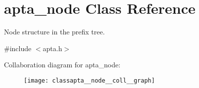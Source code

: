 \hypertarget{classapta__node}{}\section{apta\+\_\+node Class Reference}
\label{classapta__node}


Node structure in the prefix tree.  




{\ttfamily \#include $<$apta.\+h$>$}



Collaboration diagram for apta\+\_\+node\+:\nopagebreak
\begin{figure}[H]
\begin{center}
\leavevmode
\texttt{[image: classapta\_\_node\_\_coll\_\_graph]}
\end{center}
\end{figure}
